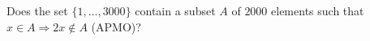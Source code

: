 Does the set $\{1, \ldots, 3000\}$ contain a subset $A$ of $2000$ elements such that $x \in A \Rightarrow 2x \notin A$ (APMO)?
